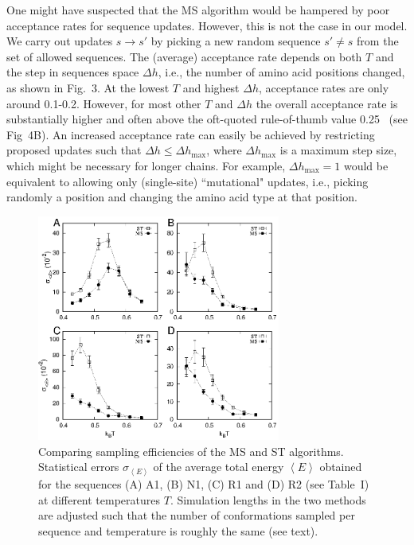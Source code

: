 \documentclass[
aip,
rsi,%
amsmath,amssymb,
reprint,%
]{revtex4-1}
\newcommand	 {\sbar}	{{s}}
\begin{document}
One might have suspected that the MS algorithm would be hampered by poor acceptance rates for sequence updates. However, this is not the case in our model. We carry out updates $\sbar\rightarrow\sbar'$ by picking a new random sequence $\sbar'\ne\sbar$ from the set of allowed sequences. The (average) acceptance rate  depends on both $T$ and the step in sequences space $\Delta h$, i.e., the number of amino acid positions changed, as shown in Fig.~3. At the lowest $T$ and highest $\Delta h$, acceptance rates are only around 0.1-0.2. However, for most other $T$ and $\Delta h$ the overall acceptance rate is substantially higher and often above the oft-quoted rule-of-thumb value 0.25~\cite{Gilks1996} (see Fig~4B). An increased acceptance rate can easily be achieved by restricting proposed updates such that $\Delta h\le\Delta h_\mathrm{max}$, where $\Delta h_\mathrm{max}$ is a maximum step size, which might be necessary for longer chains. {\color{red} For example, $\Delta h_\mathrm{max} = 1$ would be equivalent to allowing only (single-site) ``mutational" updates, i.e., picking randomly a position and changing the amino acid type at that position.}

\begin{figure}
\includegraphics[width=8.0cm]{Fig4}
\caption{Comparing sampling efficiencies of the MS and ST algorithms. Statistical errors $\sigma_{\left < E\right >}$ of the average total energy $\left < E\right >$ obtained for the sequences (A) A1, (B) N1, (C) R1 and (D) R2 (see Table~I) at different temperatures $T$. Simulation lengths in the two methods are adjusted such that the number of conformations sampled per sequence and temperature is roughly the same (see text). }
\end{figure}
\end{document}
